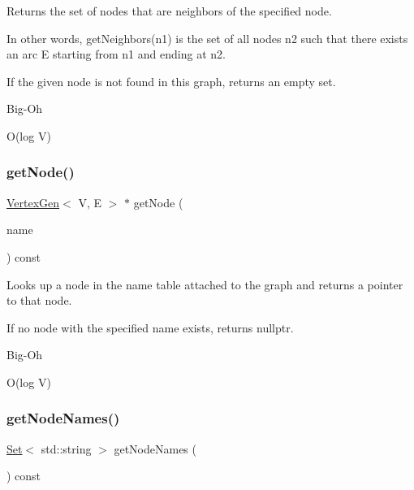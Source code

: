 Returns the set of nodes that are neighbors of the specified node. 

In other words, get\+Neighbors(n1) is the set of all nodes n2 such that there exists an arc E starting from n1 and ending at n2.

If the given node is not found in this graph, returns an empty set. \begin{DoxyRefDesc}{Big-\/\+Oh}
\item[\mbox{\hyperlink{BigOh__BigOh000074}{Big-\/\+Oh}}]O(log V) \end{DoxyRefDesc}
\mbox{\label{classGraph_a81487976cf0e576047333c85463c33aa}} 
\subsubsection{\texorpdfstring{get\+Node()}{getNode()}}
{\footnotesize\ttfamily \mbox{\hyperlink{classVertexGen}{Vertex\+Gen}}$<$ V, E $>$  $\ast$ get\+Node (\begin{DoxyParamCaption}\item[{const std\+::string \&}]{name }\end{DoxyParamCaption}) const\hspace{0.3cm}{\ttfamily [inherited]}}



Looks up a node in the name table attached to the graph and returns a pointer to that node. 

If no node with the specified name exists, returns {\ttfamily nullptr}. \begin{DoxyRefDesc}{Big-\/\+Oh}
\item[\mbox{\hyperlink{BigOh__BigOh000075}{Big-\/\+Oh}}]O(log V) \end{DoxyRefDesc}
\mbox{\label{classGraph_a3c6f37932f377dd2bf4fec61343a916d}} 
\subsubsection{\texorpdfstring{get\+Node\+Names()}{getNodeNames()}}
{\footnotesize\ttfamily \mbox{\hyperlink{classSet}{Set}}$<$ std\+::string $>$ get\+Node\+Names (\begin{DoxyParamCaption}{ }\end{DoxyParamCaption}) const\hspace{0.3cm}{\ttfamily [inherited]}}



